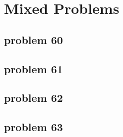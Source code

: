 \section{Mixed Problems}

\subsection{problem 60}


\subsection{problem 61}


\subsection{problem 62}


\subsection{problem 63}

